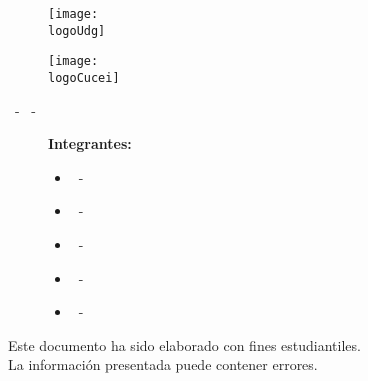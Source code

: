



	\begin{titlepage}
		\centering
		{\huge\textbf{\universidad}}\par
		\vspace{0.6cm}
		{\LARGE{\cede}}
		\vfill

		\begin{figure}[h]
			\begin{minipage}[t]{0.45\textwidth}
				\centering
				\texttt{[image: \\logoUdg]}
			\end{minipage}
			\hfill
			\begin{minipage}[t]{0.45\textwidth}
				\centering
				\texttt{[image: \\logoCucei]}
			\end{minipage}
		\end{figure}
		\vfill

		\Large{
			\division\vfill
			\textbf{\carrera}\vfill
			\textbf{\materia}
			\par\vspace{3pt}
			\seccion\ - \clave\ - \nrc\vfill
		}

		{\LARGE{\textbf{\theTitle}}}
		\vfill

		\begin{figure}[h]
			\centering
			\begin{minipage}[t]{0.75\textwidth}
				{\Large
					\textbf{Integrantes:}\par\vspace{8pt}
					\begin{itemize}
						\item \bAuthor\ - \bAuthorCode
						\item \cAuthor\ - \cAuthorCode
						\item \dAuthor\ - \dAuthorCode
						\item \eAuthor\ - \eAuthorCode
						\item \theAuthor\ - \theAuthorCode
					\end{itemize}
				}
			\end{minipage}
		\end{figure}\vfill

		\begin{tcolorbox}
			[colback=red!5!white, colframe=red!75!black]
			\centering
			Este documento ha sido elaborado con fines estudiantiles.\\
			La información presentada puede contener errores.
		\end{tcolorbox}
		\vfill
		{\large \startDate}\par
	\end{titlepage}

